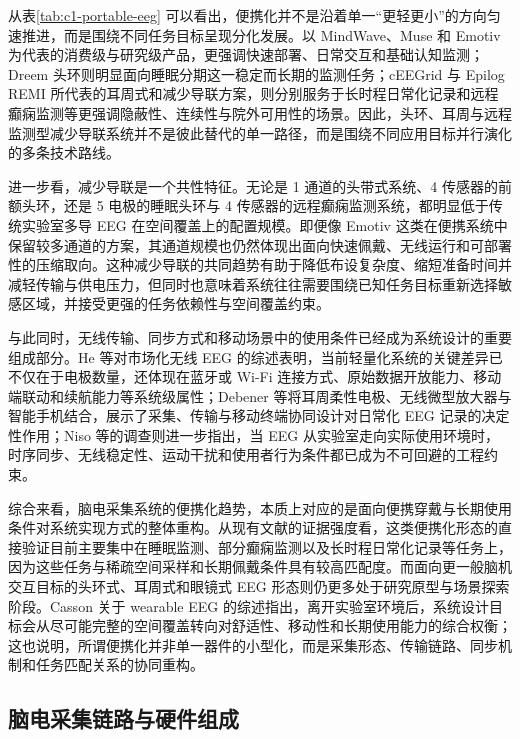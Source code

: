 从表\ref{tab:c1-portable-eeg} 可以看出，便携化并不是沿着单一“更轻更小”的方向匀速推进，而是围绕不同任务目标呈现分化发展。以 MindWave、Muse 和 Emotiv 为代表的消费级与研究级产品，更强调快速部署、日常交互和基础认知监测；Dreem 头环则明显面向睡眠分期这一稳定而长期的监测任务；cEEGrid 与 Epilog REMI 所代表的耳周式和减少导联方案，则分别服务于长时程日常化记录和远程癫痫监测等更强调隐蔽性、连续性与院外可用性的场景\cite{He23, Arn20, Deb15, Fra21b}。因此，头环、耳周与远程监测型减少导联系统并不是彼此替代的单一路径，而是围绕不同应用目标并行演化的多条技术路线。

进一步看，减少导联是一个共性特征。无论是 1 通道的头带式系统、4 传感器的前额头环，还是 5 电极的睡眠头环与 4 传感器的远程癫痫监测系统，都明显低于传统实验室多导 EEG 在空间覆盖上的配置规模\cite{He23, Arn20, Fra21b}。即便像 Emotiv 这类在便携系统中保留较多通道的方案，其通道规模也仍然体现出面向快速佩戴、无线运行和可部署性的压缩取向。这种减少导联的共同趋势有助于降低布设复杂度、缩短准备时间并减轻传输与供电压力，但同时也意味着系统往往需要围绕已知任务目标重新选择敏感区域，并接受更强的任务依赖性与空间覆盖约束\cite{Deb15, Bio22}。

与此同时，无线传输、同步方式和移动场景中的使用条件已经成为系统设计的重要组成部分。He 等对市场化无线 EEG 的综述表明，当前轻量化系统的关键差异已不仅在于电极数量，还体现在蓝牙或 Wi-Fi 连接方式、原始数据开放能力、移动端联动和续航能力等系统级属性\cite{He23}；Debener 等将耳周柔性电极、无线微型放大器与智能手机结合，展示了采集、传输与移动终端协同设计对日常化 EEG 记录的决定性作用\cite{Deb15}；Niso 等的调查则进一步指出，当 EEG 从实验室走向实际使用环境时，时序同步、无线稳定性、运动干扰和使用者行为条件都已成为不可回避的工程约束\cite{Nis22}。

综合来看，脑电采集系统的便携化趋势，本质上对应的是面向便携穿戴与长期使用条件对系统实现方式的整体重构。从现有文献的证据强度看，这类便携化形态的直接验证目前主要集中在睡眠监测、部分癫痫监测以及长时程日常化记录等任务上，因为这些任务与稀疏空间采样和长期佩戴条件具有较高匹配度\cite{Arn20, Deb15, Bio22, Fra21b}。而面向更一般脑机交互目标的头环式、耳周式和眼镜式 EEG 形态则仍更多处于研究原型与场景探索阶段\cite{He23}。Casson 关于 wearable EEG 的综述指出，离开实验室环境后，系统设计目标会从尽可能完整的空间覆盖转向对舒适性、移动性和长期使用能力的综合权衡\cite{Cas19c}；这也说明，所谓便携化并非单一器件的小型化，而是采集形态、传输链路、同步机制和任务匹配关系的协同重构。

\subsection{脑电采集链路与硬件组成}

